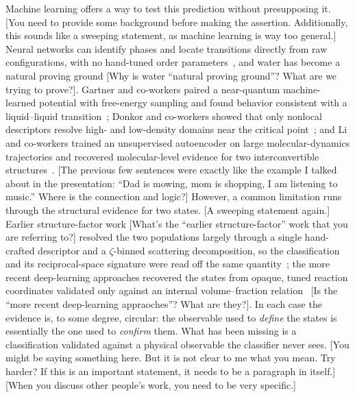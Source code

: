 \documentclass[aps, amsmath,amssymb, reprint, twocolumn, superscriptaddress]{revtex4-2}
\newcommand{\comment}[1]{\textcolor{Mahogany}{#1}}
\begin{document}
Machine learning offers a way to test this prediction without presupposing it. \comment{[You need to provide some background before making the assertion. Additionally, this sounds like a sweeping statement, as machine learning is way too general.]} Neural networks can identify phases and locate transitions directly from raw configurations, with no hand-tuned order parameters~\cite{carrasquilla_machine_2017}, and water has become a natural proving ground \comment{[Why is water ``natural proving ground''? What are we trying to prove?]}. Gartner and co-workers paired a near-quantum machine-learned potential with free-energy sampling and found behavior consistent with a liquid--liquid transition~\cite{gartner_signatures_2020}; Donkor and co-workers showed that only nonlocal descriptors resolve high- and low-density domains near the critical point~\cite{donkor_beyond_2024}; and Li and co-workers trained an unsupervised autoencoder on large molecular-dynamics trajectories and recovered molecular-level evidence for two interconvertible structures~\cite{li_evidence_2026}. \comment{[The previous few sentences were exactly like the example I talked about in the presentation: ``Dad is mowing, mom is shopping, I am listening to music.'' Where is the connection and logic?]} However, a common limitation runs through the structural evidence for two states. \comment{[A sweeping statement again.]} Earlier structure-factor work \comment{[What's the ``earlier structure-factor'' work that you are referring to?]} resolved the two populations largely through a single hand-crafted descriptor and a $\zeta$-binned scattering decomposition, so the classification and its reciprocal-space signature were read off the same quantity~\cite{shi_direct_2020}; the more recent deep-learning approaches recovered the states from opaque, tuned reaction coordinates validated only against an internal volume--fraction relation~\cite{li_evidence_2026} \comment{[Is \cite{li_evidence_2026} the ``more recent deep-learning appraoches''? What are they?]}. In each case the evidence is, to some degree,
circular: the observable used to \emph{define} the states is essentially the one used to \emph{confirm} them. What has been missing is a classification validated against a physical observable the classifier never sees. \comment{[You might be saying something here. But it is not clear to me what you mean. Try harder? If this is an important statement, it needs to be a paragraph in itself.]}
\comment{[When you discuss other people's work, you need to be very specific.]}
\end{document}
